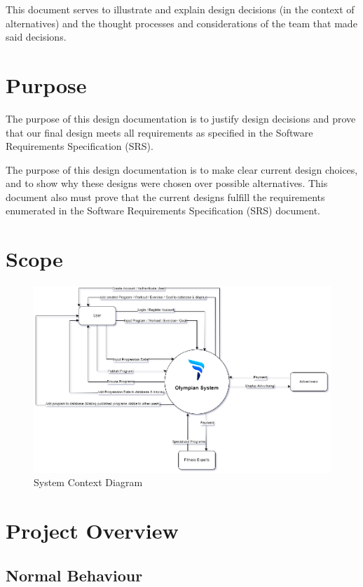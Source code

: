 \documentclass[12pt, titlepage]{article}
\begin{document}
	This document serves to illustrate and explain design decisions (in the context of alternatives) and the thought processes and considerations of the team that made said decisions.
	\section{Purpose}
	
	The purpose of this design documentation is to justify design decisions and prove that our final design meets all requirements as specified in the Software Requirements Specification (SRS).
	
	The purpose of this design documentation is to make clear current design choices, and to show why these designs were chosen over possible alternatives. This document also must prove that the current designs fulfill the requirements enumerated in the Software Requirements Specification (SRS) document.
	
	\section{Scope}
	
	\begin{figure}[H]
		\centering
		\includegraphics[scale=0.55]{system_context}
		\caption{System Context Diagram}
	\end{figure}

	\section{Project Overview}
	
	\subsection{Normal Behaviour}
  
\end{document}
